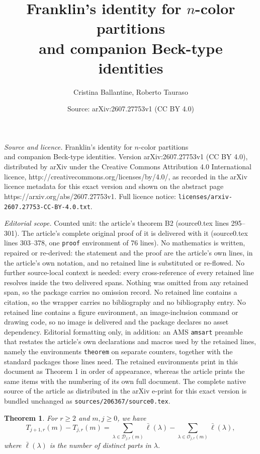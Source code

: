 \documentclass[10pt,a4paper]{amsart}
\title{Franklin's identity for $n$-color partitions\\ and companion Beck-type identities}
\author{Cristina Ballantine, Roberto Tauraso}
\date{Source: arXiv:2607.27753v1 (CC BY 4.0)}
\newtheorem{theorem}{Theorem}
\begin{document}
\maketitle

\noindent\emph{Source and licence.} Franklin's identity for $n$-color partitions\\ and companion Beck-type identities. Version arXiv:2607.27753v1 (CC BY 4.0), distributed by arXiv under the Creative Commons Attribution 4.0 International licence, http://creativecommons.org/licenses/by/4.0/, as recorded in the arXiv licence metadata for this exact version and shown on the abstract page https://arxiv.org/abs/2607.27753v1. Full licence notice: \texttt{licenses/arxiv-2607.27753-CC-BY-4.0.txt}.\par\smallskip

\noindent\textit{Editorial scope.} Counted unit: the article's theorem B2 (source0.tex lines 295--301). The article's complete original proof of it is delivered with it (source0.tex lines 303--378, one \texttt{proof} environment of 76 lines). No mathematics is written, repaired or re-derived: the statement and the proof are the article's own lines, in the article's own notation, and no retained line is substituted or re-flowed.  No further source-local context is needed: every cross-reference of every retained line resolves inside the two delivered spans.  Nothing was omitted from any retained span, so the package carries no omission record.  No retained line contains a citation, so the wrapper carries no bibliography and no bibliography entry.  No retained line contains a figure environment, an image-inclusion command or drawing code, so no image is delivered and the package declares no asset dependency.  Editorial formatting only, in addition: an AMS \texttt{amsart} preamble that restates the article's own declarations and macros used by the retained lines, namely the environments \texttt{theorem} on separate counters, together with the standard packages those lines need.  The retained environments print in this document as Theorem 1 in order of appearance, whereas the article prints the same items with the numbering of its own full document.  The complete native source of the article as distributed in the arXiv e-print for this exact version is bundled unchanged as \texttt{sources/206367/source0.tex}.
\begin{theorem}\label{B2}
For $r\geq2$ and $m,j\geq0$, we have
\begin{equation}\label{eqnB2G}
{T}_{j+1,r}(m)-{T}_{j,r}(m)=\sum_{\lambda\in\mathcal{D}_{j,r}(m)}\bar{\ell}(\lambda)-\sum_{\lambda\in\mathcal{O}_{j,r}(m)}\bar{\ell}(\lambda),
\end{equation}
 where $\bar{\ell}(\lambda)$ is the number of distinct parts in $\lambda$.
\end{theorem}
\end{document}
